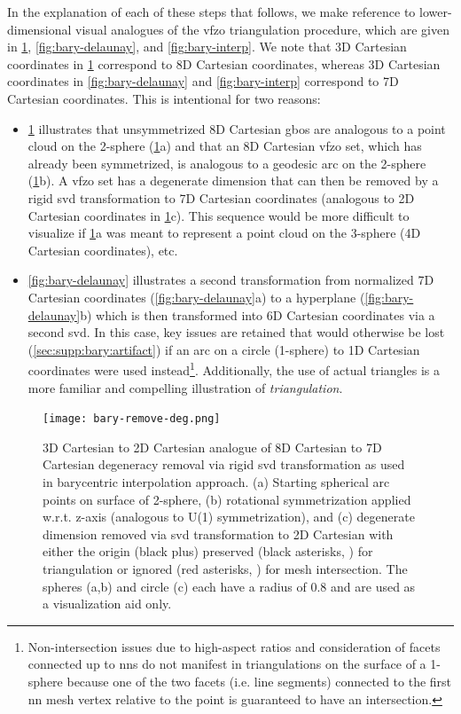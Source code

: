 \documentclass[final,twocolumn,12pt]{elsarticle}
\begin{document}
\begin{appendices}
In the explanation of each of these steps that follows, we make reference to lower-dimensional visual analogues of the \gls{vfzo} triangulation procedure, which are given in \cref{fig:bary-remove-deg}, \cref{fig:bary-delaunay}, and \cref{fig:bary-interp}. We note that 3D Cartesian coordinates in \cref{fig:bary-remove-deg} correspond to 8D Cartesian coordinates, whereas 3D Cartesian coordinates in \cref{fig:bary-delaunay} and \cref{fig:bary-interp} correspond to 7D Cartesian coordinates. This is intentional for two reasons:
\begin{itemize}
    \item \cref{fig:bary-remove-deg} illustrates that unsymmetrized 8D Cartesian \glspl{gbo} are analogous to a point cloud on the 2-sphere (\cref{fig:bary-remove-deg}a) and that an 8D Cartesian \gls{vfzo} set, which has already been symmetrized, is analogous to a geodesic arc on the 2-sphere (\cref{fig:bary-remove-deg}b). A \gls{vfzo} set has a degenerate dimension that can then be removed by a rigid \gls{svd} transformation to 7D Cartesian coordinates (analogous to 2D Cartesian coordinates in \cref{fig:bary-remove-deg}c). This sequence would be more difficult to visualize if \cref{fig:bary-remove-deg}a was meant to represent a point cloud on the 3-sphere (4D Cartesian coordinates), etc.
    \item \cref{fig:bary-delaunay} illustrates a second transformation from normalized 7D Cartesian coordinates (\cref{fig:bary-delaunay}a) to a hyperplane (\cref{fig:bary-delaunay}b) which is then transformed into 6D Cartesian coordinates via a second \gls{svd}. In this case, key issues are retained that would otherwise be lost (\cref{sec:supp:bary:artifact}) if an arc on a circle (1-sphere) to 1D Cartesian coordinates were used instead\footnote{Non-intersection issues due to high-aspect ratios and consideration of facets connected up to  \glspl{nn} do not manifest in triangulations on the surface of a 1-sphere because one of the two facets (i.e. line segments) connected to the first \gls{nn} mesh vertex relative to the \outpt{} point is guaranteed to have an intersection.}. Additionally, the use of actual triangles is a more familiar and compelling illustration of \textit{triangulation}.
\end{itemize}

\begin{figure}
    \centering
    \texttt{[image: bary-remove-deg.png]}
    \caption{3D Cartesian to 2D Cartesian analogue of 8D Cartesian to 7D Cartesian degeneracy removal via rigid \gls{svd} transformation as used in barycentric interpolation approach. (a) Starting spherical arc points on surface of 2-sphere, (b) rotational symmetrization applied w.r.t. z-axis (analogous to U(1) symmetrization), and (c) degenerate dimension removed via \acrlong{svd} transformation to 2D Cartesian with either the origin (black plus) preserved (black asterisks, ) for triangulation or ignored (red asterisks, ) for mesh intersection. The spheres (a,b) and circle (c) each have a radius of 0.8 and are used as a visualization aid only.}
    \label{fig:bary-remove-deg}
\end{figure}


\end{appendices}
\end{document}

